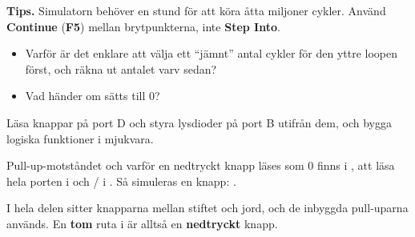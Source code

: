 \begin{aside}
\textbf{Tips.} Simulatorn behöver en stund för att köra åtta miljoner cykler. Använd
\textbf{Continue} (\textbf{F5}) mellan brytpunkterna, inte \textbf{Step Into}.
\end{aside}

\begin{itemize}
  \item Varför är det enklare att välja ett \enquote{jämnt} antal cykler för den yttre loopen först,
    och räkna ut antalet varv sedan?
  \item Vad händer om  sätts till 0?
\end{itemize}


\label{lab3:d21}
Läsa knappar på port D och styra lysdioder på port B utifrån dem, och bygga logiska funktioner i
mjukvara.

Pull-up-motståndet och varför en nedtryckt knapp läses som 0 finns i , att läsa
hela porten i  och / i . Så simuleras en
knapp: .

I hela delen sitter knapparna mellan stiftet och jord, och de inbyggda pull-uparna används. En
\textbf{tom} ruta i  är alltså en \textbf{nedtryckt} knapp.

